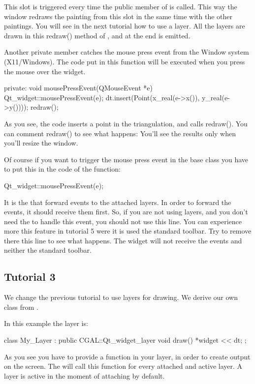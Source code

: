 This slot is triggered every time the 
public member of  is called. This way the window
redraws the painting from this slot in the same time with the other
paintings. You will see in the next tutorial how to use a layer. All
the layers are drawn in this redraw() method of , and
at the end  is emitted.

Another private member catches the mouse press event from the Window
system (X11/Windows). The code put in this function will be executed when
you press the mouse over the widget.
\begin{ccExampleCode}
private:
  void mousePressEvent(QMouseEvent *e)
  {
    Qt_widget::mousePressEvent(e);
    dt.insert(Point(x_real(e->x()), y_real(e->y())));
    redraw();
  }
\end{ccExampleCode}
As you see, the code inserts a point in the triangulation, and calls
redraw(). You can comment redraw() to see what happens: You'll see
the results only when you'll resize the window.
\begin{ccAdvanced}
Of course if you want to trigger the mouse press event in the base
class you have to put this in the code of the function:
\begin{ccExampleCode}
Qt_widget::mousePressEvent(e);
\end{ccExampleCode}
It is the  that forward events to the attached
layers. In order to forward the events, it should receive them
first. So, if you are not using layers, and you don't need the
 to handle this event, you should not use this line.
You can experience more this feature in tutorial 5 were it is used the
standard toolbar. Try to remove there this line to see what
happens. The widget will not receive the events and neither the
standard toolbar.
\end{ccAdvanced}

\subsection*{Tutorial 3}

We change the previous tutorial to use layers for drawing. We derive
our own class from .

In this example the layer is:
\begin{ccExampleCode}
class My_Layer : public CGAL::Qt_widget_layer{
  void draw(){
    *widget << dt;
  }
};
\end{ccExampleCode}
As you see you have to provide a  function in your layer, in
order to create output on the screen. The  will call this
 function for every attached and active layer. A layer is active
in the moment of attaching by default.

